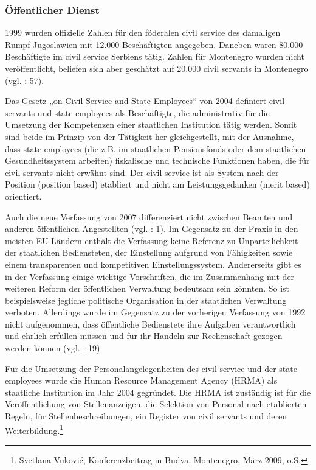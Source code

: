 \subsubsection{Öffentlicher Dienst }
1999 wurden offizielle Zahlen für den föderalen civil service des damaligen Rumpf-Jugoslawien mit 12.000 Beschäftigten angegeben. Daneben waren 80.000 Beschäftigte im civil service Serbiens tätig. Zahlen für Montenegro wurden nicht veröffentlicht, beliefen sich aber geschätzt auf 20.000 civil servants in Montenegro (vgl. \cite{sevic} : 57).\par
Das Gesetz „on Civil Service and State Employees“ von 2004 definiert civil servants und state employees als Beschäftigte, die administrativ für die Umsetzung der Kompetenzen einer staatlichen Institution tätig werden. Somit sind beide im Prinzip von der Tätigkeit her gleichgestellt, mit der Ausnahme, dass state employees (die z.B. im staatlichen Pensionsfonds oder dem staatlichen Gesundheitssystem arbeiten) fiskalische und technische Funktionen haben, die für civil servants nicht erwähnt sind. Der civil service ist als System nach der Position (position based) etabliert und nicht am Leistungsgedanken (merit based) orientiert. \par
Auch die neue Verfassung von 2007 differenziert nicht zwischen Beamten und anderen öffentlichen Angestellten (vgl. \cite{oecd08c} : 1). Im Gegensatz zu der Praxis in den meisten EU-Ländern enthält die Verfassung keine Referenz zu Unparteilichkeit der staatlichen Bediensteten, der Einstellung aufgrund von Fähigkeiten sowie einem transparenten und kompetitiven Einstellungssystem. Andererseits gibt es in der Verfassung einige wichtige Vorschriften, die im Zusammenhang mit der weiteren Reform der öffentlichen Verwaltung bedeutsam sein könnten. So ist beispielsweise jegliche politische Organisation in der staatlichen Verwaltung verboten. Allerdings wurde im Gegensatz zu der vorherigen Verfassung von 1992 nicht aufgenommen, dass öffentliche Bedienstete ihre Aufgaben verantwortlich und ehrlich erfüllen müssen und für ihr Handeln zur Rechenschaft gezogen werden können (vgl. \cite{dzamuk} : 19). \par
Für die Umsetzung der Personalangelegenheiten des civil service und der state employees wurde die Human Resource Management Agency (HRMA) als staatliche Institution im Jahr 2004 gegründet. Die HRMA ist zuständig ist für die Veröffentlichung von Stellenanzeigen, die Selektion von Personal nach etablierten Regeln, für Stellenbeschreibungen, ein Register von civil servants und deren Weiterbildung.\footnote{Svetlana Vuković, Konferenzbeitrag in Budva, Montenegro, März 2009, o.S.}\par	
